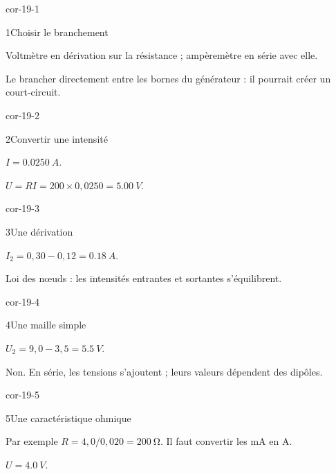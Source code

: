 \clearpage{}
\corrigesSouples
\begin{blocLivre}{cor-19-1}\begin{corrige}{1}{Choisir le branchement}
\begin{questions}
\item Voltmètre en dérivation sur la résistance ; ampèremètre en série avec elle.
\item Le brancher directement entre les bornes du générateur : il pourrait créer un court-circuit.
\end{questions}
\end{corrige}\end{blocLivre}
\begin{blocLivre}{cor-19-2}\begin{corrige}{2}{Convertir une intensité}
\begin{questions}
\item $I=\qty{0,0250}{A}$.
\item $U=RI=200\times0,0250=\qty{5,00}{V}$.
\end{questions}
\end{corrige}\end{blocLivre}
\begin{blocLivre}{cor-19-3}\begin{corrige}{3}{Une dérivation}
\begin{questions}
\item $I_2=0,30-0,12=\qty{0,18}{A}$.
\item Loi des nœuds : les intensités entrantes et sortantes s’équilibrent.
\end{questions}
\end{corrige}\end{blocLivre}
\begin{blocLivre}{cor-19-4}\begin{corrige}{4}{Une maille simple}
\begin{questions}
\item $U_2=9,0-3,5=\qty{5,5}{V}$.
\item Non. En série, les tensions s’ajoutent ; leurs valeurs dépendent des dipôles.
\end{questions}
\end{corrige}\end{blocLivre}
\begin{blocLivre}{cor-19-5}\begin{corrige}{5}{Une caractéristique ohmique}
\begin{questions}
\item Par exemple $R=4,0/0,020=\qty{200}{\ohm}$. Il faut convertir les mA en A.
\item $U=\qty{4,0}{V}$.
\end{questions}
\end{corrige}\end{blocLivre}

